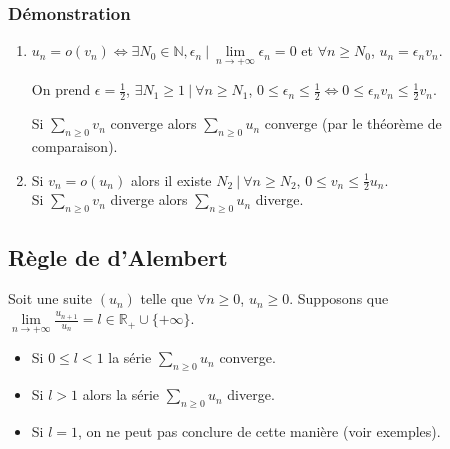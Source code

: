 \documentclass[a4paper,10pt]{book} %
\newcommand{\R}{\mathbb{R}}
\newcommand{\N}{\mathbb{N}}
\newcommand{\tq}{~|~}
\begin{document}
\subsubsection{Démonstration}
\begin{enumerate}
\item $u_n=o(v_n)\Leftrightarrow \exists N_0\in\N,\epsilon_n\tq\lim\limits_{n\rightarrow +\infty}\epsilon_n=0$ et $\forall n\geq N_0$, $u_n=\epsilon_nv_n$.

On prend $\epsilon=\frac{1}{2}$, $\exists N_1\geq 1 \tq \forall n\geq N_1$, $0\leq \epsilon_n\leq \frac{1}{2} \Leftrightarrow 0\leq \epsilon_nv_n\leq \frac{1}{2}v_n$.\smallskip

Si $\sum_{n\geq 0}v_n$ converge alors $\sum_{n\geq 0} u_n$ converge (par le théorème de comparaison).\\

\item Si $v_n=o(u_n)$ alors il existe $N_2\tq \forall n\geq N_2$, $0\leq v_n \leq \frac{1}{2}u_n$.\\
Si $\sum_{n\geq 0}v_n$ diverge alors $\sum_{n\geq 0} u_n$ diverge.
\end{enumerate}

\newpage

\subsection{Règle de d'Alembert}
Soit une suite $(u_n)$ telle que $\forall n\geq 0$, $u_n\geq 0$. Supposons que $\lim\limits_{n\rightarrow +\infty} \frac{u_{n+1}}{u_n}=l\in\R_+\cup\{+\infty\}$.

\begin{itemize}[label=$\cdot$]
\item Si $0\leq l <1$ la série $\sum_{n\geq 0}u_n$ converge.
\item Si $l>1$ alors la série $\sum_{n\geq 0} u_n$ diverge.
\item Si $l=1$, on ne peut pas conclure de cette manière (voir exemples).
\end{itemize}
\end{document}

